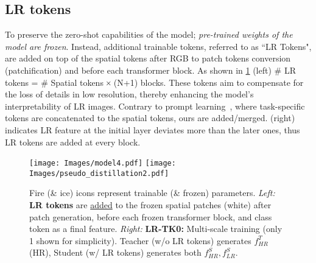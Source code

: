 \subsection{LR tokens}
\vspace{-6pt}
\label{sec:model_training}
To preserve the zero-shot capabilities of the model; \textit{pre-trained weights of the model are frozen}.
Instead, additional trainable tokens, referred to as ``LR Tokens", are added on top of the spatial tokens after RGB to patch tokens conversion (patchification) and before each transformer block. As shown in \cref{fig:model} (left) \# LR tokens = \# Spatial tokens $\!\times\!$ (N+1) blocks. 
These tokens aim to compensate for the loss of details in low resolution, thereby enhancing the model’s interpretability of LR images.
Contrary to prompt learning~\citep{jia2022visual}, where task-specific tokens are concatenated to the spatial tokens, ours are added/merged.  
 (right)  indicates LR feature at the initial layer deviates more than the later ones, thus LR tokens are added at every block.  



\begin{figure}[!t]
\centering
\subfloat
{\texttt{[image: Images/model4.pdf]}}
\hfill
\subfloat
{
\texttt{[image: Images/pseudo\_distillation2.pdf]}
}
\caption{
Fire (\& ice) icons represent trainable  (\& frozen) parameters.
\textit{Left:} \textbf{LR tokens} are \underline{added} to the frozen spatial patches (white) after patch generation, before each frozen transformer block, and class token as a final feature. 
\textit{Right:} \textbf{LR-TK0:}
Multi-scale training (only 1 shown for simplicity). 
Teacher (w/o LR tokens) generates $f^T_{HR}$  (HR), Student (w/ LR tokens) generates both $f^S_{HR},f^S_{LR}$.
}
\label{fig:pseudo_distillation}
\label{fig:model}
\end{figure}

